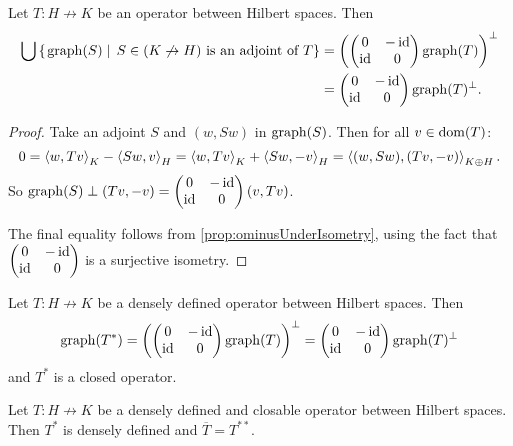 \begin{proposition}
Let $T: H\not\to K$ be an operator between Hilbert spaces. Then
\begin{align*}
\bigcup\left\{\left. \operatorname{graph}(S) \;\right|\; \text{$S\in (K\not\to H)$ is an adjoint of $T$} \right\} &= \left( \begin{pmatrix}
0 & -\operatorname{id} \\ \operatorname{id} & 0
\end{pmatrix}\operatorname{graph}(T) \right)^\perp \\
&=  \begin{pmatrix}
0 & -\operatorname{id} \\ \operatorname{id} & 0
\end{pmatrix}\operatorname{graph}(T)^\perp.
\end{align*}
\end{proposition}
\begin{proof}
Take an adjoint $S$ and $(w, Sw)$ in $\operatorname{graph}(S)$. Then for all $v\in\operatorname{dom}(T)$:
\[ 0 = \left\langle w, Tv \right\rangle_K - \left\langle Sw, v \right\rangle_H = \left\langle w, Tv \right\rangle_K + \left\langle Sw, -v \right\rangle_H = \left\langle (w, Sw), (Tv,-v) \right\rangle_{K\oplus H}. \]
So $\operatorname{graph}(S) \perp (Tv,-v) = \begin{pmatrix}
0 & -\operatorname{id} \\ \operatorname{id} & 0
\end{pmatrix} (v,Tv)$.

The final equality follows from \ref{prop:ominusUnderIsometry}, using the fact that $\begin{pmatrix}
0 & -\operatorname{id} \\ \operatorname{id} & 0
\end{pmatrix}$ is a surjective isometry.
\end{proof}
\begin{corollary}
Let $T: H\not\to K$ be a densely defined operator between Hilbert spaces. Then
\[ \operatorname{graph}(T^*) = \left( \begin{pmatrix}
0 & -\operatorname{id} \\ \operatorname{id} & 0
\end{pmatrix}\operatorname{graph}(T) \right)^\perp =  \begin{pmatrix}
0 & -\operatorname{id} \\ \operatorname{id} & 0
\end{pmatrix}\operatorname{graph}(T)^\perp \]
and $T^*$ is a closed operator.
\end{corollary}
\begin{corollary}
Let $T: H\not\to K$ be a densely defined and closable operator between Hilbert spaces. Then $T^*$ is densely defined and $\overline{T} = T^{**}$.
\end{corollary}
